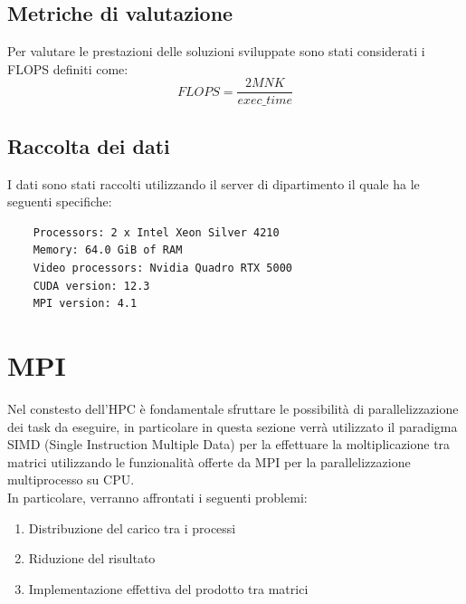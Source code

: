 \documentclass[conference]{IEEEtran}
\begin{document}
\subsection{Metriche di valutazione}
Per valutare le prestazioni delle soluzioni sviluppate sono stati considerati i FLOPS definiti come:
\begin{equation}
    FLOPS = \frac{2MNK}{exec\_time}
\end{equation}
\subsection{Raccolta dei dati}
I dati sono stati raccolti utilizzando il server di dipartimento il quale ha le seguenti specifiche:
\begin{verbatim}
    Processors: 2 x Intel Xeon Silver 4210
    Memory: 64.0 GiB of RAM
    Video processors: Nvidia Quadro RTX 5000
    CUDA version: 12.3
    MPI version: 4.1
\end{verbatim}
\section{MPI}
Nel constesto dell'HPC è fondamentale sfruttare le possibilità di parallelizzazione dei task da eseguire, in particolare in questa sezione verrà utilizzato il paradigma SIMD (Single Instruction Multiple Data) per la effettuare la moltiplicazione tra matrici utilizzando le funzionalità offerte da MPI per la parallelizzazione multiprocesso su CPU.\\ In particolare, verranno affrontati i seguenti problemi:
\begin{enumerate}
    \item Distribuzione del carico tra i processi
    \item Riduzione del risultato
    \item Implementazione effettiva del prodotto tra matrici
\end{enumerate}
\end{document}
